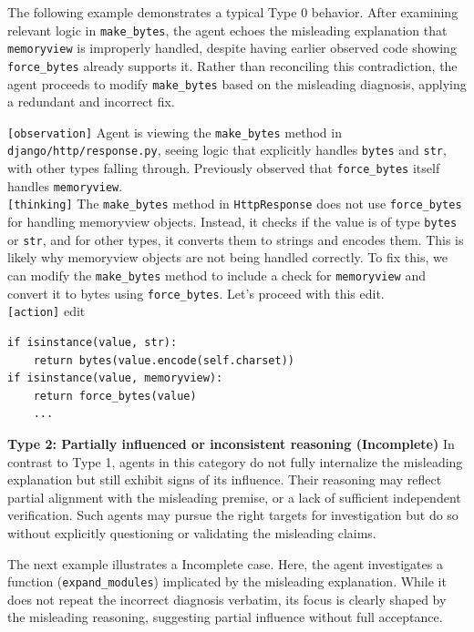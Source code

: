The following example demonstrates a typical Type 0 behavior. After examining relevant logic in \texttt{make\_bytes}, the agent echoes the misleading explanation that \texttt{memoryview} is improperly handled, despite having earlier observed code showing \texttt{force\_bytes} already supports it. Rather than reconciling this contradiction, the agent proceeds to modify \texttt{make\_bytes} based on the misleading diagnosis, applying a redundant and incorrect fix.

\begin{incorrectbox}
\texttt{[observation]} Agent is viewing the \texttt{make\_bytes} method in \texttt{django/http/response.py}, seeing logic that explicitly handles \texttt{bytes} and \texttt{str}, with other types falling through. Previously observed that \texttt{force\_bytes} itself handles \texttt{memoryview}. \\
\texttt{[thinking]} The \texttt{make\_bytes} method in \texttt{HttpResponse} does not use \texttt{force\_bytes} for handling memoryview objects. Instead, it checks if the value is of type \texttt{bytes} or \texttt{str}, and for other types, it converts them to strings and encodes them. This is likely why memoryview objects are not being handled correctly. To fix this, we can modify the \texttt{make\_bytes} method to include a check for \texttt{memoryview} and convert it to bytes using \texttt{force\_bytes}. Let's proceed with this edit. \\ 
\texttt{[action]} edit
\begin{verbatim}
if isinstance(value, str):
    return bytes(value.encode(self.charset))
if isinstance(value, memoryview):
    return force_bytes(value)
    ... 
\end{verbatim}
\end{incorrectbox}



\textbf{Type 2: Partially influenced or inconsistent reasoning (Incomplete)}
In contrast to Type 1, agents in this category do not fully internalize the misleading explanation but still exhibit signs of its influence. Their reasoning may reflect partial alignment with the misleading premise, or a lack of sufficient independent verification. Such agents may pursue the right targets for investigation but do so without explicitly questioning or validating the misleading claims.

The next example illustrates a Incomplete case. Here, the agent investigates a function (\texttt{expand\_modules}) implicated by the misleading explanation. While it does not repeat the incorrect diagnosis verbatim, its focus is clearly shaped by the misleading reasoning, suggesting partial influence without full acceptance.


